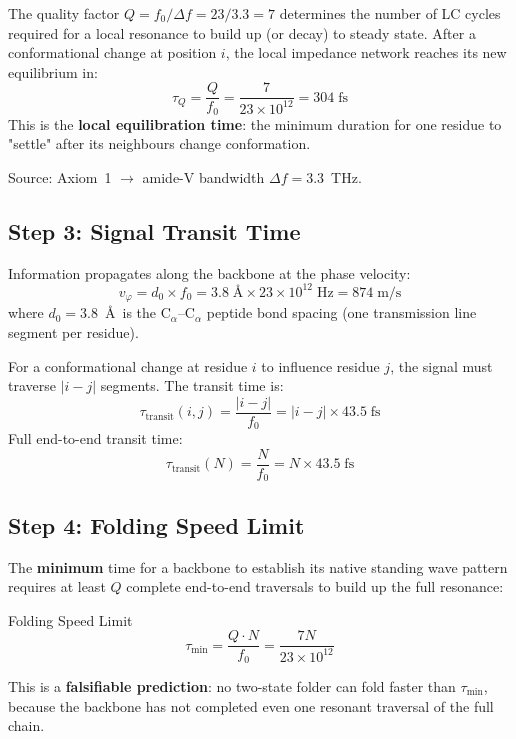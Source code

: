 The quality factor $Q = f_0/\Delta f = 23/3.3 = 7$ determines the number of LC cycles required for a local resonance to build up (or decay) to steady state.
After a conformational change at position $i$, the local impedance network reaches its new equilibrium in:
\begin{equation}
    \tau_Q = \frac{Q}{f_0} = \frac{7}{23 \times 10^{12}} = 304\;\text{fs}
    \label{eq:tau_Q}
\end{equation}
This is the \textbf{local equilibration time}: the minimum duration for one residue to "settle" after its neighbours change conformation.

Source: Axiom~1 $\to$ amide-V bandwidth $\Delta f = 3.3$~THz.

\subsection{Step 3: Signal Transit Time}
\label{sec:transit}

Information propagates along the backbone at the phase velocity:
\begin{equation}
    v_\varphi = d_0 \times f_0 = 3.8\;\text{\AA} \times 23 \times 10^{12}\;\text{Hz} = 874\;\text{m/s}
    \label{eq:v_phase}
\end{equation}
where $d_0 = 3.8$~\AA\ is the C$_\alpha$--C$_\alpha$ peptide bond spacing (one transmission line segment per residue).

For a conformational change at residue $i$ to influence residue $j$, the signal must traverse $|i-j|$ segments.  The transit time is:
\begin{equation}
    \tau_\text{transit}(i,j) = \frac{|i-j|}{f_0} = |i-j| \times 43.5\;\text{fs}
    \label{eq:tau_transit}
\end{equation}
Full end-to-end transit time:
\begin{equation}
    \tau_\text{transit}(N) = \frac{N}{f_0} = N \times 43.5\;\text{fs}
    \label{eq:tau_transit_N}
\end{equation}

\subsection{Step 4: Folding Speed Limit}
\label{sec:speed_limit}

The \textbf{minimum} time for a backbone to establish its native standing wave pattern requires at least $Q$ complete end-to-end traversals to build up the full resonance:
\begin{resultbox}{Folding Speed Limit}
\begin{equation}
    \tau_\text{min} = \frac{Q \cdot N}{f_0} = \frac{7N}{23 \times 10^{12}}
    \label{eq:tau_min}
\end{equation}
\end{resultbox}
This is a \textbf{falsifiable prediction}: no two-state folder can fold faster than $\tau_\text{min}$, because the backbone has not completed even one resonant traversal of the full chain.


